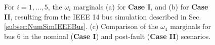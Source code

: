 \documentclass[10pt,twocolumn]{IEEEtran}
\begin{document}
\begin{figure}[ht!]
   \hspace{\fill}
   \hspace{\fill}
\caption{\small{For $i=1,\hdots,5$, the $\omega_{i}$ marginals (a) for \textbf{Case I}, and (b) for \textbf{Case II}, resulting from the IEEE 14 bus simulation described in Sec. \ref{subsec:NumSimIEEEBus}. (c) Comparison of the $\omega_{4}$ marginals for bus 6 in the nominal (\textbf{Case I}) and post-fault (\textbf{Case II}) scenarios.}}
\vspace*{-0.1in}
\label{fig:IEEE14omegamarginalsCase12}
\end{figure}
\end{document}
